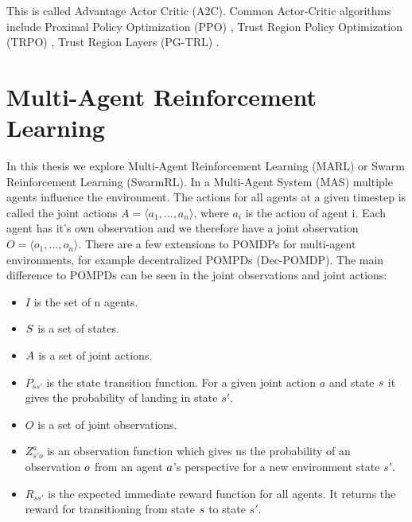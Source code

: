 This is called Advantage Actor Critic (A2C). Common Actor-Critic algorithms include Proximal Policy Optimization (PPO) , Trust Region Policy Optimization (TRPO) , Trust Region Layers (PG-TRL) .



\section{Multi-Agent Reinforcement Learning}
In this thesis we explore Multi-Agent Reinforcement Learning (MARL) or Swarm Reinforcement Learning (SwarmRL). In a Multi-Agent System (MAS) multiple agents influence the environment. The actions for all agents at a given timestep is called the joint actions $A = \langle a_1,...,a_n\rangle$, where $a_i$ is the action of agent i. Each agent has it's own observation and we therefore have a joint observation $O = \langle o_1,...,o_n\rangle$. There are a few extensions to POMDPs for multi-agent environments, for example decentralized POMPDs (Dec-POMDP). The main difference to POMPDs can be seen in the joint observations and joint actions:

\begin{itemize}[noitemsep,nolistsep]
	\item $I$ is the set of n agents.
	\item $S$ is a set of states.
	\item $A$ is a set of joint actions.
	\item $P_{ss'}$ is the state transition function. For a given joint action $a$ and state $s$ it gives the probability of landing in state $s'$.
	\item $O$ is a set of joint observations.
	\item $Z_{s'o}^a$ is an observation function which gives us the probability of an observation $o$ from an agent $a$'s perspective for a new environment state $s'$.
	\item $R_{ss'}$ is the expected immediate reward function for all agents. It returns the reward for transitioning from state $s$ to state $s'$.
\end{itemize}



